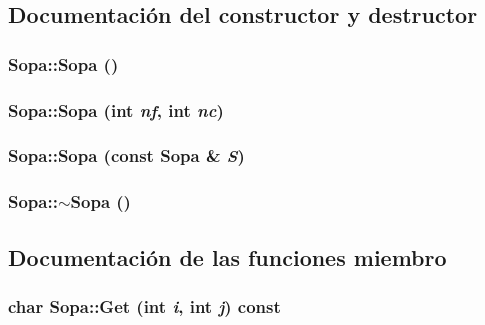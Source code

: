 \subsection{Documentación del constructor y destructor}
\hypertarget{class_sopa_3fd197061417a2d3ed4c8d241fcc0e6d}{
\subsubsection[{Sopa}]{\setlength{\rightskip}{0pt plus 5cm}Sopa::Sopa ()}}
\label{class_sopa_3fd197061417a2d3ed4c8d241fcc0e6d}


\hypertarget{class_sopa_10cb615d72a5611d8b8ebecb91305983}{
\subsubsection[{Sopa}]{\setlength{\rightskip}{0pt plus 5cm}Sopa::Sopa (int {\em nf}, \/  int {\em nc})}}
\label{class_sopa_10cb615d72a5611d8b8ebecb91305983}


\hypertarget{class_sopa_7acac0d05edf78fad798d56006bf9909}{
\subsubsection[{Sopa}]{\setlength{\rightskip}{0pt plus 5cm}Sopa::Sopa (const {\bf Sopa} \& {\em S})}}
\label{class_sopa_7acac0d05edf78fad798d56006bf9909}


\hypertarget{class_sopa_6773f50bfea79450b22629d7dac123a8}{
\subsubsection[{$\sim$Sopa}]{\setlength{\rightskip}{0pt plus 5cm}Sopa::$\sim$Sopa ()}}
\label{class_sopa_6773f50bfea79450b22629d7dac123a8}




\subsection{Documentación de las funciones miembro}
\hypertarget{class_sopa_03af8acd61e5b23acdf1f010fb36845c}{
\subsubsection[{Get}]{\setlength{\rightskip}{0pt plus 5cm}char Sopa::Get (int {\em i}, \/  int {\em j}) const}}
\label{class_sopa_03af8acd61e5b23acdf1f010fb36845c}



